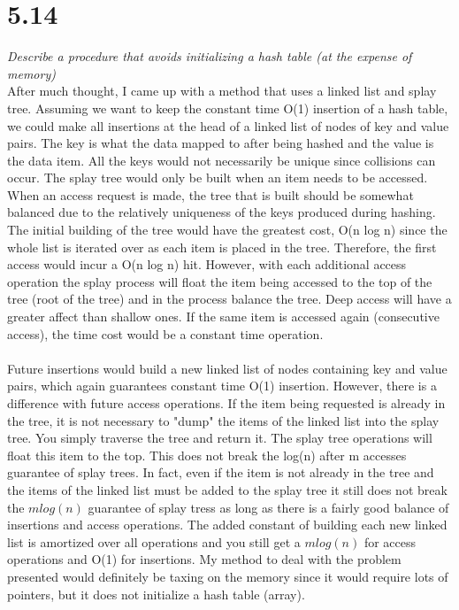 \documentclass[12pt,letterpaper]{article}
\begin{document}
\section*{5.14}
\textit{Describe a procedure that avoids initializing a hash table (at the expense of memory)}\\
After much thought, I came up with a method that uses a linked list and splay tree. Assuming we want to keep the constant time O(1) insertion of a hash table, we could make all insertions at the head of a linked list of nodes of key and value pairs. The key is what the data mapped to after being hashed and the value is the data item. All the keys would not necessarily be unique since collisions can occur. The splay tree would only be built when an item needs to be accessed. When an access request is made, the tree that is built should be somewhat balanced due to the relatively uniqueness of the keys produced during hashing. The initial building of the tree would have the greatest cost, O(n log n) since the whole list is iterated over as each item is placed in the tree. Therefore, the first access would incur a O(n log n) hit. However, with each additional access operation the splay process will float the item being accessed to the top of the tree (root of the tree) and in the process balance the tree. Deep access will have a greater affect than shallow ones. If the same item is accessed again (consecutive access), the time cost would be a constant time operation.\\\\
Future insertions would build a new linked list of nodes containing key and value pairs, which again guarantees constant time O(1) insertion. However, there is a difference with future access operations. If the item being requested is already in the tree, it is not necessary to "dump" the items of the linked list into the splay tree. You simply traverse the tree and return it. The splay tree operations will float this item to the top. This does not break the log(n) after m accesses guarantee of splay trees. In fact, even if the item is not already in the tree and the items of the linked list must be added to the splay tree it still does not break the $mlog(n)$ guarantee of splay tress as long as there is a fairly good balance of insertions and access operations. The added constant of building each new linked list is amortized over all operations and you still get a $mlog(n)$ for access operations and O(1) for insertions.
My method to deal with the problem presented would definitely be taxing on the memory since it would require lots of pointers, but it does not initialize a hash table (array).
\newpage
\end{document}
